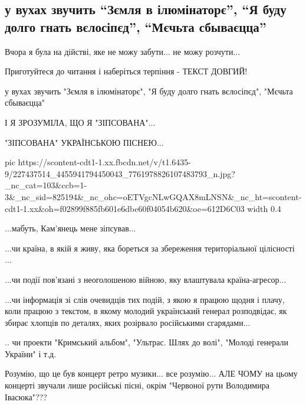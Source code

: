  
 
 
 
 
\subsection{у вухах звучить \enquote{Зємля в ілюмінаторє}, \enquote{Я буду долго гнать вєлосіпєд}, \enquote{Мєчьта сбываєцца} }
\label{sec:29_07_2021.fb.hmeljuk_yanel.1.nizhyn_mova_pesni_retro}

Вчора я була на дійстві, яке не можу забути... не можу розчути...  

Приготуйтеся до читання і наберіться терпіння - ТЕКСТ ДОВГИЙ!

у вухах звучить "Зємля в ілюмінаторє", "Я буду долго гнать вєлосіпєд", "Мєчьта сбываєцца" 

І Я ЗРОЗУМІЛА, ЩО Я "ЗІПСОВАНА"...

"ЗІПСОВАНА" УКРАЇНСЬКОЮ ПІСНЕЮ...

\ifcmt
  pic https://scontent-cdt1-1.xx.fbcdn.net/v/t1.6435-9/227437514_4455941794450043_7761978826107483793_n.jpg?_nc_cat=103&ccb=1-3&_nc_sid=825194&_nc_ohc=oETVgcNLwGQAX8mLNSN&_nc_ht=scontent-cdt1-1.xx&oh=f02899f885fb601e6dbe60f04054b620&oe=612D6C03
  width 0.4
\fi

...мабуть, Кам'янець мене зіпсував... 

...чи країна, в якій я живу, яка бореться за збереження територіальної
цілісності ... 

...чи події пов'язані з неоголошеною війною, яку влаштувала країна-агресор... 

...чи інформація зі слів очевидців тих подій, з якою я працюю щодня і плачу,
коли працюю з текстом, в якому молодий український  генерал розподвідає, як
збирає хлопців по деталях, яких розірвало російськими сгарядами... 

.. чи проекти "Кримський альбом", "Ультрас. Шлях до волі", "Молоді генерали
України" і т.д.

Розумію, що це був концерт ретро музики... все розумію... АЛЕ ЧОМУ на цьому
концерті звучали лише російські пісні, окрім "Червоної рути Володимира
Івасюка"???

